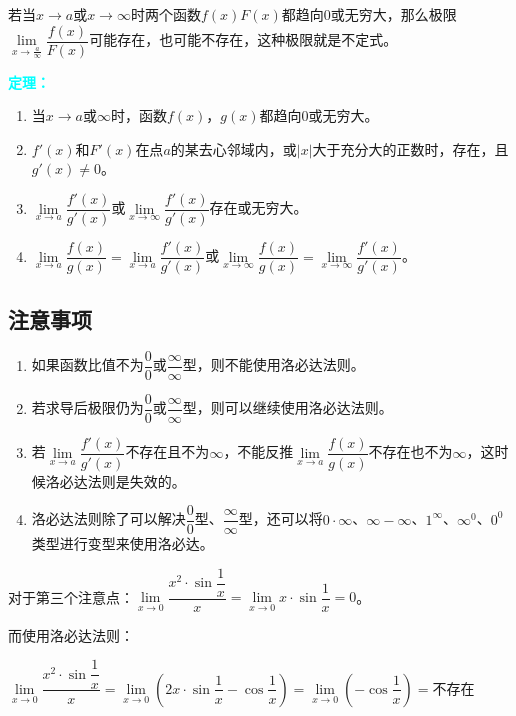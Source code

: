 \documentclass[UTF8, 12pt]{ctexart}
\begin{document}
若当$x\to a$或$x\to\infty$时两个函数$f(x)F(x)$都趋向0或无穷大，那么极限$\lim\limits_{x\to \frac{a}{\infty}}\dfrac{f(x)}{F(x)}$可能存在，也可能不存在，这种极限就是不定式。\medskip

\textcolor{aqua}{\textbf{定理：}}

\begin{enumerate}
    \item 当$x\to a\text{或}\infty$时，函数$f(x)$，$g(x)$都趋向0或无穷大。
    \item $f'(x)$和$F'(x)$在点$a$的某去心邻域内，或$\vert x\vert$大于充分大的正数时，存在，且$g'(x)\neq 0$。
    \item $\lim\limits_{x\to a}\dfrac{f'(x)}{g'(x)}$或$\lim\limits_{x\to\infty}\dfrac{f'(x)}{g'(x)}$存在或无穷大。
    \item $\lim\limits_{x\to a}\dfrac{f(x)}{g(x)}=\lim\limits_{x\to a}\dfrac{f'(x)}{g'(x)}$或$\lim\limits_{x\to\infty}\dfrac{f(x)}{g(x)}=\lim\limits_{x\to\infty}\dfrac{f'(x)}{g'(x)}$。
\end{enumerate}

\subsection{注意事项}

\begin{enumerate}
    \item 如果函数比值不为$\dfrac{0}{0}$或$\dfrac{\infty}{\infty}$型，则不能使用洛必达法则。
    \item 若求导后极限仍为$\dfrac{0}{0}$或$\dfrac{\infty}{\infty}$型，则可以继续使用洛必达法则。
    \item 若$\lim\limits_{x\to a}\dfrac{f'(x)}{g'(x)}$不存在且不为$\infty$，不能反推$\lim\limits_{x\to a}\dfrac{f(x)}{g(x)}$不存在也不为$\infty$，这时候洛必达法则是失效的。
    \item 洛必达法则除了可以解决$\dfrac{0}{0}$型、$\dfrac{\infty}{\infty}$型，还可以将$0\cdot\infty$、$\infty-\infty$、$1^\infty$、$\infty^0$、$0^0$类型进行变型来使用洛必达。
\end{enumerate}

对于第三个注意点：$\lim\limits_{x\to 0}\dfrac{x^2\cdot\sin\dfrac{1}{x}}{x}=\lim\limits_{x\to 0}x\cdot\sin\dfrac{1}{x}=0$。

而使用洛必达法则：\medskip

$\lim\limits_{x\to 0}\dfrac{x^2\cdot\sin\dfrac{1}{x}}{x}=\lim\limits_{x\to 0}\left(2x\cdot\sin\dfrac{1}{x}-\cos\dfrac{1}{x}\right)=\lim\limits_{x\to 0}\left(-\cos\dfrac{1}{x}\right)=\text{不存在}$
\end{document}
